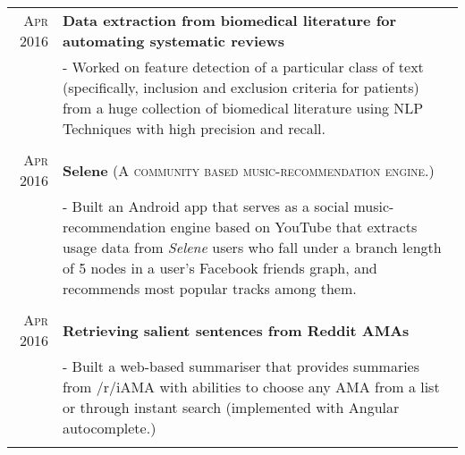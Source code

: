 \documentclass[a4paper,10pt]{extarticle} %
\begin{document}
\begin{tabular}{r|p{17cm}}

\textsc{Apr 2016} & \textbf{Data extraction from biomedical literature for automating systematic reviews} \\
& \footnotesize{- Worked on feature detection of a particular class of text (specifically, inclusion and exclusion criteria for patients) from a huge collection of biomedical literature using NLP Techniques with high precision and recall.}\\
\multicolumn{2}{c}{} \\

\textsc{Apr 2016} & \textbf{Selene} \textsc{(A community based music-recommendation engine.)} \\
& \footnotesize{- Built an Android app that serves as a social music-recommendation engine based on YouTube that extracts usage data from {\itshape{Selene}} users who fall under a branch length of 5 nodes in a user's Facebook friends graph, and recommends most popular tracks among them.}\\
\multicolumn{2}{c}{} \\

\textsc{Apr 2016} & \textbf{Retrieving salient sentences from Reddit AMAs} \\
& \footnotesize{- Built a web-based summariser that provides summaries from /r/iAMA with abilities to choose any AMA from a list or through instant search (implemented with Angular autocomplete.)}\\
\multicolumn{2}{c}{} \\


\end{tabular}
\end{document}
